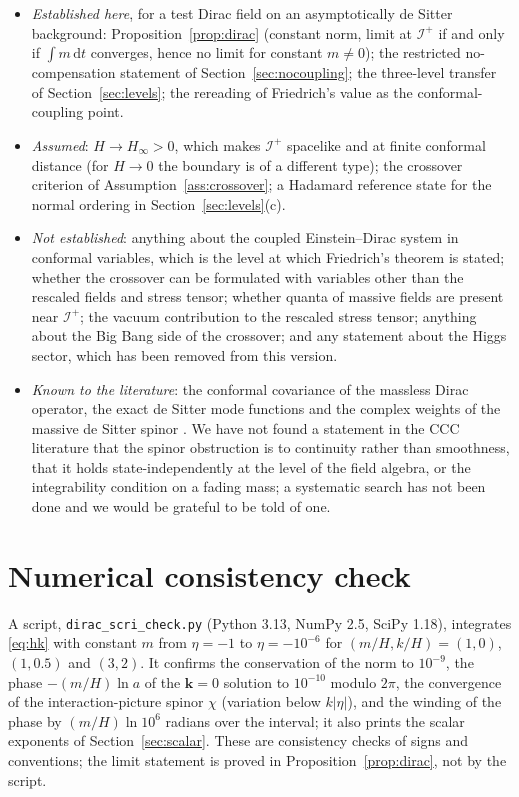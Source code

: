 \documentclass[11pt,a4paper]{article}
\theoremstyle{definition}
\newcommand{\scri}{\mathscr{I}^{+}}
\newcommand{\dd}{\mathrm{d}}
\begin{document}
\begin{itemize}[leftmargin=1.5em]
\item \emph{Established here}, for a test Dirac field on an asymptotically de Sitter background: Proposition~\ref{prop:dirac} (constant norm, limit at $\scri$ if and only if $\int m\,\dd t$ converges, hence no limit for constant $m\neq0$); the restricted no-compensation statement of Section~\ref{sec:nocoupling}; the three-level transfer of Section~\ref{sec:levels}; the rereading of Friedrich's value as the conformal-coupling point.
\item \emph{Assumed}: $H\to H_{\infty}>0$, which makes $\scri$ spacelike and at finite conformal distance (for $H\to0$ the boundary is of a different type); the crossover criterion of Assumption~\ref{ass:crossover}; a Hadamard reference state for the normal ordering in Section~\ref{sec:levels}(c).
\item \emph{Not established}: anything about the coupled Einstein--Dirac system in conformal variables, which is the level at which Friedrich's theorem is stated; whether the crossover can be formulated with variables other than the rescaled fields and stress tensor; whether quanta of massive fields are present near $\scri$; the vacuum contribution to the rescaled stress tensor; anything about the Big Bang side of the crossover; and any statement about the Higgs sector, which has been removed from this version.
\item \emph{Known to the literature}: the conformal covariance of the massless Dirac operator, the exact de Sitter mode functions and the complex weights of the massive de Sitter spinor \cite{AllenLutken,BirrellDavies,ParkerToms}. We have not found a statement in the CCC literature that the spinor obstruction is to continuity rather than smoothness, that it holds state-independently at the level of the field algebra, or the integrability condition on a fading mass; a systematic search has not been done and we would be grateful to be told of one.
\end{itemize}

\section*{Numerical consistency check}
A script, \texttt{dirac\_scri\_check.py} (Python 3.13, NumPy 2.5, SciPy 1.18), integrates \eqref{eq:hk} with constant $m$ from $\eta=-1$ to $\eta=-10^{-6}$ for $(m/H,k/H)=(1,0)$, $(1,0.5)$ and $(3,2)$. It confirms the conservation of the norm to $10^{-9}$, the phase $-(m/H)\ln a$ of the $\mathbf{k}=0$ solution to $10^{-10}$ modulo $2\pi$, the convergence of the interaction-picture spinor $\chi$ (variation below $k|\eta|$), and the winding of the phase by $(m/H)\ln10^{6}$ radians over the interval; it also prints the scalar exponents of Section~\ref{sec:scalar}. These are consistency checks of signs and conventions; the limit statement is proved in Proposition~\ref{prop:dirac}, not by the script.
\end{document}
